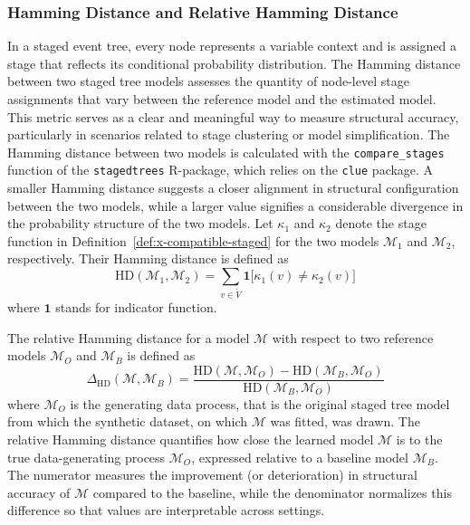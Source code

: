 \documentclass[preprint,12pt]{elsarticle}
\newcommand{\blue}{\color{blue}}
\begin{document}



\subsubsection{ Hamming Distance and Relative Hamming Distance}

In a staged event tree, every node represents a variable context and is assigned a stage that reflects its conditional probability distribution. The Hamming distance between two staged tree models assesses the quantity of node-level stage assignments that vary between the reference model and the estimated model. This metric serves as a clear and meaningful way to measure structural accuracy, particularly in scenarios related to stage clustering or model simplification. 
The Hamming distance between two models is calculated with the 
{\texttt{compare\_stages}} function of the {\texttt{stagedtrees}} R-package, which relies on the {\texttt{clue}} package.
A smaller Hamming distance suggests a closer alignment in structural configuration between the two models, while a larger value signifies a considerable divergence in the probability structure of the two models.
Let \( \kappa_1 \) and \( \kappa_2 \) denote the stage function in Definition~\ref{def:x-compatible-staged} for the two models 
\(\mathcal{M}_1\) and \(\mathcal{M}_2\), respectively. 
Their Hamming distance is defined as
\[
\text{HD}(\mathcal{M}_1, \mathcal{M}_2)
= \sum_{v \in \mathring{V}} \mathbf{1}\big[\kappa_1(v) \neq \kappa_2(v)\big] 
\]
where $\mathbf{1}$ stands for indicator function.

The relative Hamming distance for a model $\mathcal M$ with respect to two reference models $\mathcal M_O$  and $\mathcal M_B$ is defined as
\[
\Delta_{\text{HD}} (\mathcal{M} ,  \mathcal{M}_B ) = 
\frac{ \text{HD}(\mathcal{M}, \mathcal{M}_O) - \text{HD}( \mathcal{M}_B, \mathcal{M}_O )
}{\text{HD}( \mathcal{M}_B, \mathcal{M}_O )}
\]
where $\mathcal M_O$ is the generating data process, that is the original staged tree model from which the synthetic dataset, on which $\mathcal{M}$ was fitted, was drawn. The relative Hamming distance quantifies how close the learned model $\mathcal{M}$ is to the true data-generating process $\mathcal{M}_O$, expressed relative to a baseline model $\mathcal{M}_B$. The numerator measures the improvement (or deterioration) in structural accuracy of $\mathcal{M}$ compared to the baseline, while the denominator normalizes this difference so that values are interpretable across settings.
\end{document}
